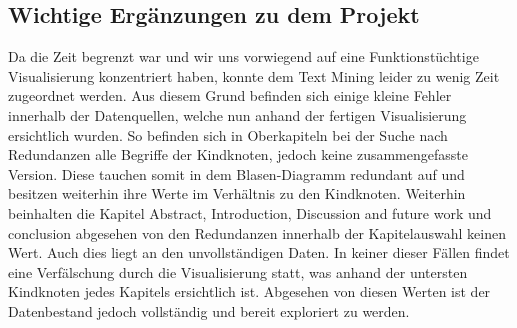 \subsection*{Wichtige Erg\"anzungen zu dem Projekt}
Da die Zeit begrenzt war und wir uns vorwiegend auf eine Funktionst\"uchtige Visualisierung konzentriert haben, konnte dem Text Mining leider zu wenig Zeit zugeordnet werden. Aus diesem Grund befinden sich einige kleine Fehler innerhalb der Datenquellen, welche nun anhand der fertigen Visualisierung ersichtlich wurden. So befinden sich in Oberkapiteln bei der Suche nach Redundanzen alle Begriffe der Kindknoten, jedoch keine zusammengefasste Version. Diese tauchen somit in dem Blasen-Diagramm redundant auf und besitzen weiterhin ihre Werte im Verh\"altnis zu den Kindknoten. Weiterhin beinhalten die Kapitel Abstract, Introduction, Discussion and future work und conclusion abgesehen von den Redundanzen innerhalb der Kapitelauswahl keinen Wert. Auch dies liegt an den unvollst\"andigen Daten. In keiner dieser F\"allen findet eine Verf\"alschung durch die Visualisierung statt, was anhand der untersten Kindknoten jedes Kapitels ersichtlich ist. Abgesehen von diesen Werten ist der Datenbestand jedoch vollst\"andig und bereit exploriert zu werden.